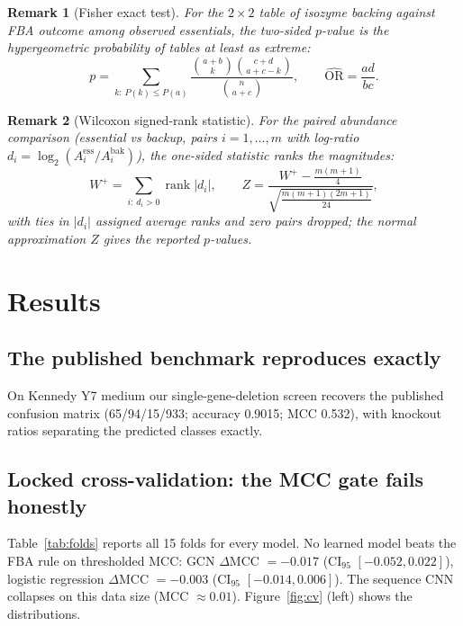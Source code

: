 \documentclass[12pt]{article}
\newtheorem{remark}{Remark}
\begin{document}
\begin{remark}[Fisher exact test]
For the $2\times2$ table of isozyme backing against FBA outcome among
observed essentials, the two-sided $p$-value is the hypergeometric
probability of tables at least as extreme:
\begin{equation}
p = \sum_{k:\,P(k)\le P(a)}
\frac{\binom{a+b}{k}\binom{c+d}{a+c-k}}{\binom{n}{a+c}},
\qquad
\widehat{\mathrm{OR}} = \frac{ad}{bc}. \label{eq:fisher}
\end{equation}
\end{remark}

\begin{remark}[Wilcoxon signed-rank statistic]
For the paired abundance comparison (essential vs backup, pairs $i =
1,\dots,m$ with log-ratio $d_i = \log_2(A^{\mathrm{ess}}_i /
A^{\mathrm{bak}}_i)$), the one-sided statistic ranks the magnitudes:
\begin{equation}
W^{+} = \sum_{i:\,d_i > 0} \operatorname{rank}|d_i|,
\qquad
Z = \frac{W^{+} - \tfrac{m(m+1)}{4}}
{\sqrt{\tfrac{m(m+1)(2m+1)}{24}}}, \label{eq:wilcoxon}
\end{equation}
with ties in $|d_i|$ assigned average ranks and zero pairs dropped; the
normal approximation $Z$ gives the reported $p$-values.
\end{remark}

\section{Results}
\subsection{The published benchmark reproduces exactly}
On Kennedy Y7 medium our single-gene-deletion screen recovers the published
confusion matrix (65/94/15/933; accuracy 0.9015; MCC 0.532), with
knockout ratios separating the predicted classes exactly.
\subsection{Locked cross-validation: the MCC gate fails honestly}
Table~\ref{tab:folds} reports all 15 folds for every model. No learned
model beats the FBA rule on thresholded MCC: GCN $\Delta$MCC $=-0.017$
(CI$_{95}$ $[-0.052, 0.022]$), logistic regression $\Delta$MCC $=-0.003$
(CI$_{95}$ $[-0.014, 0.006]$). The sequence CNN collapses on this data
size (MCC $\approx 0.01$). Figure~\ref{fig:cv} (left) shows the
distributions.
\end{document}
